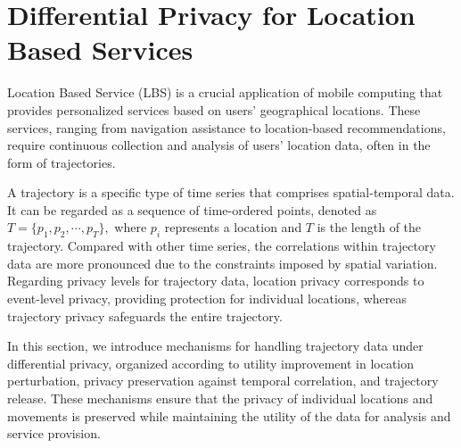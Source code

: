 \section{Differential Privacy for Location Based Services}\label{sec6}
Location Based Service (LBS) is a crucial application of mobile computing that provides personalized services based on users' geographical locations. These services, ranging from navigation assistance to location-based recommendations, require continuous collection and analysis of users' location data, often in the form of trajectories.

A trajectory is a specific type of time series that comprises spatial-temporal data. 
It can be regarded as a sequence of time-ordered points, denoted as $T=\{p_1, p_2, \cdots, p_{T}\},$ where $p_i$ represents a location and $T$ is the length of the trajectory. 
Compared with other time series, the correlations within trajectory data are more pronounced due to the constraints imposed by spatial variation. Regarding privacy levels for trajectory data, location privacy corresponds to event-level privacy, providing protection for individual locations, whereas trajectory privacy safeguards the entire trajectory.

In this section, we introduce mechanisms for handling trajectory data under differential privacy, organized according to utility improvement in location perturbation, privacy preservation against temporal correlation, and trajectory release. These mechanisms ensure that the privacy of individual locations and movements is preserved while maintaining the utility of the data for analysis and service provision.

